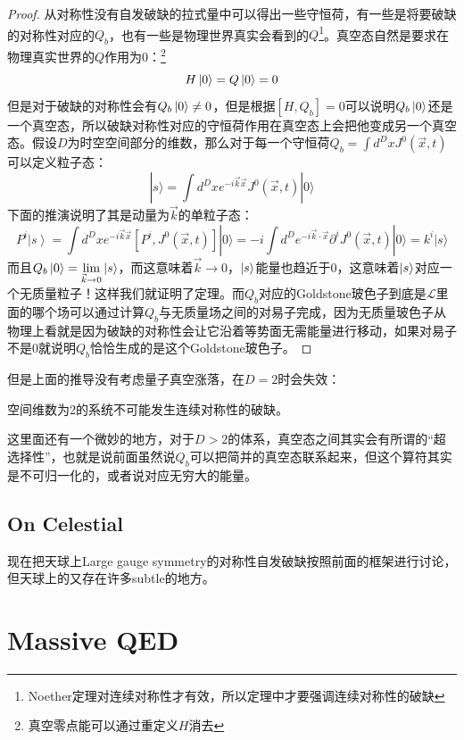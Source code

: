 \begin{proof}
	从对称性没有自发破缺的拉式量中可以得出一些守恒荷，有一些是将要破缺的对称性对应的$Q_b$，也有一些是物理世界真实会看到的$Q$\footnote{Noether定理对连续对称性才有效，所以定理中才要强调连续对称性的破缺}。真空态自然是要求在物理真实世界的$Q$作用为0：\footnote{真空零点能可以通过重定义$H$消去}
	\begin{equation}
		H\ket{0}=Q\ket{0}=0
	\end{equation}
	但是对于破缺的对称性会有$Q_b\ket{0}\neq0$，但是根据$[H,Q_b]=0$可以说明$Q_b\ket{0}$还是一个真空态，所以破缺对称性对应的守恒荷作用在真空态上会把他变成另一个真空态。假设$D$为时空空间部分的维数，那么对于每一个守恒荷$Q_b=\int d^DxJ^0(\vec{x},t)$可以定义粒子态：
	\begin{equation}
		|s\rangle=\int d^{D}xe^{-i\vec{k}\vec{x}}J^{0}(\vec{x},t)|0\rangle 
	\end{equation}
	下面的推演说明了其是动量为$\vec{k}$的单粒子态：
	\begin{equation}
		P^{i}\left|s\right\rangle=\int d^{D}xe^{-i\vec{k}\vec{x}}[P^{i},J^{0}(\vec{x},t)]|0\rangle=-i\int d^{D}e^{-i\vec{k}\cdot\vec{x}}\partial^{i}J^{0}(\vec{x},t)|0\rangle=k^{i}|s\rangle 
	\end{equation}
	而且$Q_b\ket{0}=\lim\limits_{\vec{k}\to0}\ket{s}$，而这意味着$\vec{k}\to0$，$\ket{s}$能量也趋近于0，这意味着$\ket{s}$对应一个无质量粒子！这样我们就证明了定理。而$Q_b$对应的Goldstone玻色子到底是$\mathcal{L}$里面的哪个场可以通过计算$Q_b$与无质量场之间的对易子完成，因为无质量玻色子从物理上看就是因为破缺的对称性会让它沿着等势面无需能量进行移动，如果对易子不是0就说明$Q_b$恰恰生成的是这个Goldstone玻色子。
\end{proof}
但是上面的推导没有考虑量子真空涨落，在$D=2$时会失效：
\begin{theorem}
	空间维数为2的系统不可能发生连续对称性的破缺。
\end{theorem}
这里面还有一个微妙的地方，对于$D>2$的体系，真空态之间其实会有所谓的“超选择性”，也就是说前面虽然说$Q_b$可以把简并的真空态联系起来，但这个算符其实是不可归一化的，或者说对应无穷大的能量。
\subsection{On Celestial}
现在把天球上Large gauge symmetry的对称性自发破缺按照前面的框架进行讨论，但天球上的又存在许多subtle的地方。
\section{Massive QED}

